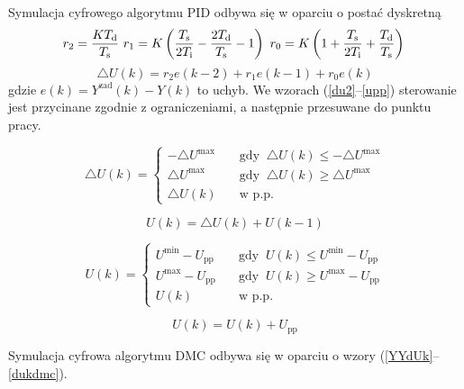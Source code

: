Symulacja cyfrowego algorytmu PID odbywa się w oparciu o postać dyskretną
\begin{equation}
r_2 = \frac{K T_{\mathrm{d}}}{T_{\mathrm{s}}} \
r_1 = K \left( \frac{T_{\mathrm{s}}}{2 T_{\mathrm{i}}} - \frac{2 T_{\mathrm{d}}}{T_{\mathrm{s}}} - 1 \right) \
r_0 = K \left( 1 + \frac{T_{\mathrm{s}}}{2 T_{\mathrm{i}}} + \frac{T_{\mathrm{d}}}{T_{\mathrm{s}}} \right) \\
\label{r_t}
\end{equation}
\begin{equation}
\triangle U(k) = r_2 e(k-2) + r_1 e(k-1) + r_0 e(k)
\label{du}
\end{equation}
gdzie $e(k)=Y^{\mathrm{zad}}(k) - Y(k)$ to uchyb. We wzorach (\ref{du2}--\ref{upp}) sterowanie jest przycinane zgodnie z ograniczeniami, a następnie przesuwane do punktu pracy.

\begin{equation}
\triangle U(k) = 
\begin{cases}
-\triangle U^{\mathrm{max}} &\quad \textrm{gdy } \ \triangle U(k) \le -\triangle U^{\mathrm{max}} \\
\triangle U^{\mathrm{max}} &\quad \textrm{gdy } \ \triangle U(k) \ge \triangle U^{\mathrm{max}}  \\
\triangle U(k) &\quad \textrm{w p.p.}
\end{cases}
\label{du2}
\end{equation}

\begin{equation}
U(k) = \triangle U(k) + U(k-1)
\label{uk}
\end{equation}

\begin{equation}
U(k) = 
\begin{cases}
U^{\mathrm{min}} - U_{\mathrm{pp}} &\quad \textrm{gdy } \ U(k) \le U^{\mathrm{min}}-U_{\mathrm{pp}} \\
U^{\mathrm{max}}-U_{\mathrm{pp}} &\quad \textrm{gdy } \ U(k) \ge U^{\mathrm{max}}-U_{\mathrm{pp}}  \\
U(k) &\quad \textrm{w p.p.}
\end{cases}
\label{uk2}
\end{equation}

\begin{equation}
U(k) = U(k) + U_{\mathrm{pp}}
\label{upp}
\end{equation}

Symulacja cyfrowa algorytmu DMC odbywa się w oparciu o wzory (\ref{YYdUk}--\ref{dukdmc}).

